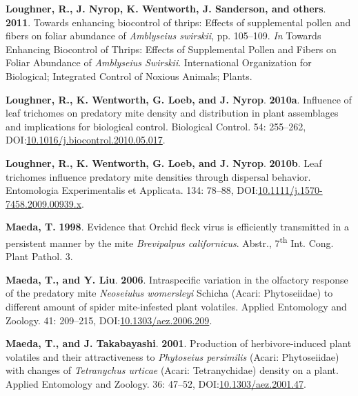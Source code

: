 \documentclass[12pt,final,CPage]{ufthesis}
\newlength{\cslhangindent}
\newenvironment{CSLReferences}[2] %
{%
	\setlength{\parindent}{0pt}
	\ifodd #1 \everypar{\setlength{\hangindent}{\cslhangindent}}\ignorespaces\fi
	\ifnum #2 > 0
	\setlength{\parskip}{#2\baselineskip}
	\fi
}%
{}
\begin{document}
{\begin{CSLReferences}{1}{0}
  \leavevmode{}%
  \textbf{Loughner, R., J. Nyrop, K. Wentworth, J. Sanderson, and others}. \textbf{2011}. Towards enhancing biocontrol of thrips: Effects of supplemental pollen and fibers on foliar abundance of {\emph{Amblyseius swirskii}}, pp. 105--109. \emph{In} Towards Enhancing Biocontrol of Thrips: Effects of Supplemental Pollen and Fibers on Foliar Abundance of {\emph{Amblyseius Swirskii}}. International Organization for Biological; Integrated Control of Noxious Animals; Plants.

  \leavevmode{}%
  \textbf{Loughner, R., K. Wentworth, G. Loeb, and J. Nyrop}. \textbf{2010a}. Influence of leaf trichomes on predatory mite density and distribution in plant assemblages and implications for biological control. Biological Control. 54: 255--262, DOI:\href{https://doi.org/10.1016/j.biocontrol.2010.05.017}{10.1016/j.biocontrol.2010.05.017}.

  \leavevmode{}%
  \textbf{Loughner, R., K. Wentworth, G. Loeb, and J. Nyrop}. \textbf{2010b}. Leaf trichomes influence predatory mite densities through dispersal behavior. Entomologia Experimentalis et Applicata. 134: 78--88, DOI:\href{https://doi.org/10.1111/j.1570-7458.2009.00939.x}{10.1111/j.1570-7458.2009.00939.x}.

  \leavevmode{}%
  \textbf{Maeda, T.} \textbf{1998}. Evidence that {Orchid fleck virus} is efficiently transmitted in a persistent manner by the mite {\emph{Brevipalpus californicus}}. Abstr., 7\textsuperscript{th} Int. Cong. Plant Pathol. 3.

  \leavevmode{}%
  \textbf{Maeda, T., and Y. Liu}. \textbf{2006}. Intraspecific variation in the olfactory response of the predatory mite {\emph{Neoseiulus womersleyi}} {Schicha} {({Acari}: {Phytoseiidae})} to different amount of spider mite-infested plant volatiles. Applied Entomology and Zoology. 41: 209--215, DOI:\href{https://doi.org/10.1303/aez.2006.209}{10.1303/aez.2006.209}.

  \leavevmode{}%
  \textbf{Maeda, T., and J. Takabayashi}. \textbf{2001}. Production of herbivore-induced plant volatiles and their attractiveness to {\emph{Phytoseius persimilis}} {({Acari}: {Phytoseiidae})} with changes of {\emph{Tetranychus urticae}} {({Acari}: Tetranychidae)} density on a plant. Applied Entomology and Zoology. 36: 47--52, DOI:\href{https://doi.org/10.1303/aez.2001.47}{10.1303/aez.2001.47}.


\end{CSLReferences}}
\end{document}
